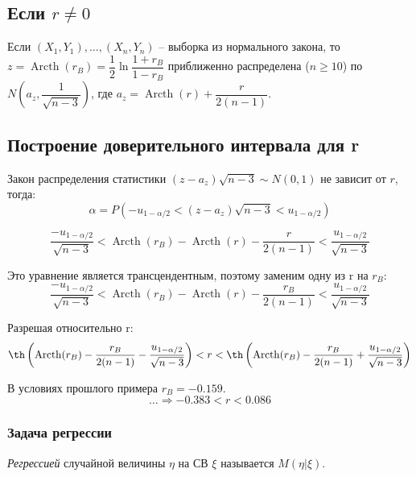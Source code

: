 \subsection{Если $r \neq 0$}

\begin{theorem}[Фишера]
  Если $(X_1, Y_1), \dots, (X_n, Y_n)$ -- выборка из нормального закона, то
  $z = \operatorname{Arcth} (r_B) = \dfrac{1}{2} \ln \dfrac{1 + r_B}{1 - r_B}$
  приближенно распределена ($n \geqslant 10$) по
  $N\left(a_z, \dfrac{1}{\sqrt{n-3}}\right)$, где
  $a_z = \operatorname{Arcth} (r) + \dfrac{r}{2(n-1)}$.
\end{theorem}

\subsection{Построение доверительного интервала для r}

Закон распределения статистики $(z-a_z) \sqrt{n-3} \sim N(0, 1)$ не зависит от $r$, тогда:
\[
  \alpha = P(-u_{1-\alpha/2} < (z-a_z) \sqrt{n-3} < u_{1 - \alpha/2})
\]

\[
  \dfrac{-u_{1-\alpha/2}}{\sqrt{n-3}} < \operatorname{Arcth} (r_B) - \operatorname{Arcth} (r) - \dfrac{r}{2(n-1)} < \dfrac{u_{1-\alpha/2}}{\sqrt{n-3}}
\]

Это уравнение является трансцендентным, поэтому заменим одну из r на $r_B$:
\[
  \dfrac{-u_{1-\alpha/2}}{\sqrt{n-3}} < \operatorname{Arcth} (r_B) - \operatorname{Arcth} (r) - \dfrac{r_B}{2(n-1)} < \dfrac{u_{1-\alpha/2}}{\sqrt{n-3}}
\]

Разрешая относительно r:
\[
  \th \left( \operatorname{Arcth}(r_B) - \dfrac{r_B}{2(n-1)} - \dfrac{u_{1-\alpha/2}}{\sqrt{n-3}} \right)
  < r
  < \th \left( \operatorname{Arcth}(r_B) - \dfrac{r_B}{2(n-1)} + \dfrac{u_{1-\alpha/2}}{\sqrt{n-3}} \right)
\]

\begin{ex}
  В условиях прошлого примера $r_B = -0.159$.
  \[
    \dots \Rightarrow -0.383 < r < 0.086
  \]
\end{ex}

\subsubsection{Задача регрессии}

\begin{definition}
  \emph{Регрессией} случайной величины $\eta$ на СВ $\xi$ называется $M(\eta | \xi)$.   
\end{definition}


